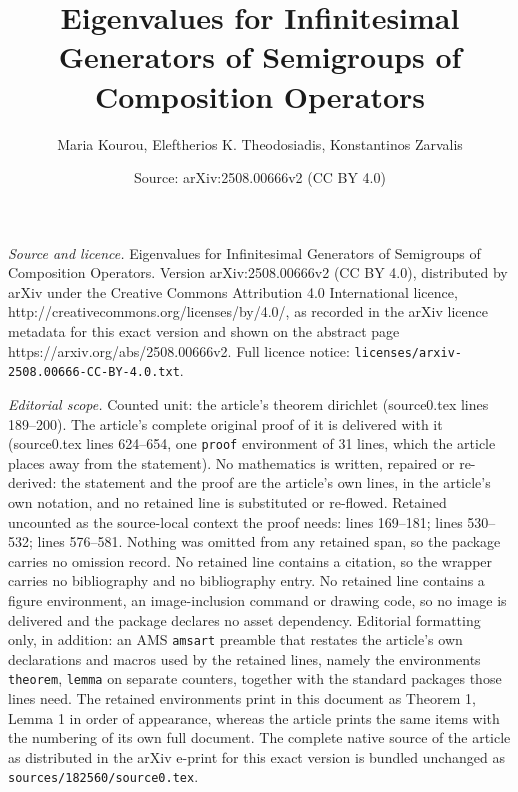 \documentclass[10pt,a4paper]{amsart}
\title{Eigenvalues for Infinitesimal Generators of Semigroups of Composition Operators}
\author{Maria Kourou, Eleftherios K. Theodosiadis, Konstantinos Zarvalis}
\date{Source: arXiv:2508.00666v2 (CC BY 4.0)}
\begin{document}
\maketitle

\noindent\emph{Source and licence.} Eigenvalues for Infinitesimal Generators of Semigroups of Composition Operators. Version arXiv:2508.00666v2 (CC BY 4.0), distributed by arXiv under the Creative Commons Attribution 4.0 International licence, http://creativecommons.org/licenses/by/4.0/, as recorded in the arXiv licence metadata for this exact version and shown on the abstract page https://arxiv.org/abs/2508.00666v2. Full licence notice: \texttt{licenses/arxiv-2508.00666-CC-BY-4.0.txt}.\par\smallskip

\noindent\textit{Editorial scope.} Counted unit: the article's theorem dirichlet (source0.tex lines 189--200). The article's complete original proof of it is delivered with it (source0.tex lines 624--654, one \texttt{proof} environment of 31 lines, which the article places away from the statement). No mathematics is written, repaired or re-derived: the statement and the proof are the article's own lines, in the article's own notation, and no retained line is substituted or re-flowed.  Retained uncounted as the source-local context the proof needs: lines 169--181; lines 530--532; lines 576--581.  Nothing was omitted from any retained span, so the package carries no omission record.  No retained line contains a citation, so the wrapper carries no bibliography and no bibliography entry.  No retained line contains a figure environment, an image-inclusion command or drawing code, so no image is delivered and the package declares no asset dependency.  Editorial formatting only, in addition: an AMS \texttt{amsart} preamble that restates the article's own declarations and macros used by the retained lines, namely the environments \texttt{theorem}, \texttt{lemma} on separate counters, together with the standard packages those lines need.  The retained environments print in this document as Theorem 1, Lemma 1 in order of appearance, whereas the article prints the same items with the numbering of its own full document.  The complete native source of the article as distributed in the arXiv e-print for this exact version is bundled unchanged as \texttt{sources/182560/source0.tex}.
\end{document}
